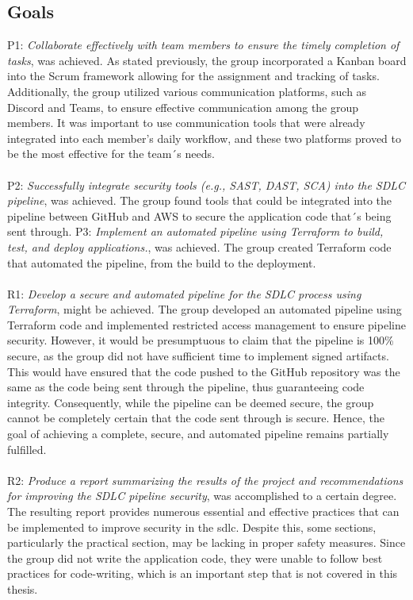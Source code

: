 \subsection{Goals}
P1: \textit{Collaborate effectively with team members to ensure the timely completion of tasks}, was achieved. As stated previously, the group incorporated a Kanban board into the Scrum framework allowing for the assignment and tracking of tasks. Additionally, the group utilized various communication platforms, such as Discord and Teams, to ensure effective communication among the group members. It was important to use communication tools that were already integrated into each member's daily workflow, and these two platforms proved to be the most effective for the team´s needs. 
\\~\\
P2: \textit{Successfully integrate security tools (e.g., SAST, DAST, SCA) into the SDLC pipeline}, was achieved. The group found tools that could be integrated into the pipeline between GitHub and AWS to secure the application code that´s being sent through.
\newpage
P3: \textit{Implement an automated pipeline using Terraform to build, test, and deploy applications.}, was achieved. The group created Terraform code that automated the pipeline, from the build to the deployment. 
\\~\\
R1: \textit{Develop a secure and automated pipeline for the SDLC process using Terraform}, might be achieved. The group developed an automated pipeline using Terraform code and implemented restricted access management to ensure pipeline security. However, it would be presumptuous to claim that the pipeline is 100\% secure, as the group did not have sufficient time to implement signed artifacts. This would have ensured that the code pushed to the GitHub repository was the same as the code being sent through the pipeline, thus guaranteeing code integrity. Consequently, while the pipeline can be deemed secure, the group cannot be completely certain that the code sent through is secure. Hence, the goal of achieving a complete, secure, and automated pipeline remains partially fulfilled. 
\\~\\
R2: \textit{Produce a report summarizing the results of the project and recommendations for improving the SDLC pipeline security}, was accomplished to a certain degree. The resulting report provides numerous essential and effective practices that can be implemented to improve security in the \acrshort{sdlc}. Despite this, some sections, particularly the practical section, may be lacking in proper safety measures. Since the group did not write the application code, they were unable to follow best practices for code-writing, which is an important step that is not covered in this thesis.   



